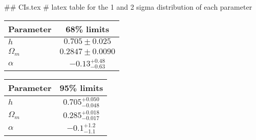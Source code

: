 ## CIs.tex
# latex table for the 1 and 2 sigma distribution of each parameter

\begin{tabular} { l  c}
 Parameter &  68\% limits\\
\hline
{\boldmath$h              $} & $0.705\pm 0.025            $\\
{\boldmath$\Omega_m       $} & $0.2847\pm 0.0090          $\\
{\boldmath$\alpha         $} & $-0.13^{+0.48}_{-0.63}     $\\
\hline
\end{tabular}

\begin{tabular} { l  c}
 Parameter &  95\% limits\\
\hline
{\boldmath$h              $} & $0.705^{+0.050}_{-0.048}   $\\
{\boldmath$\Omega_m       $} & $0.285^{+0.018}_{-0.017}   $\\
{\boldmath$\alpha         $} & $-0.1^{+1.2}_{-1.1}        $\\
\hline
\end{tabular}
